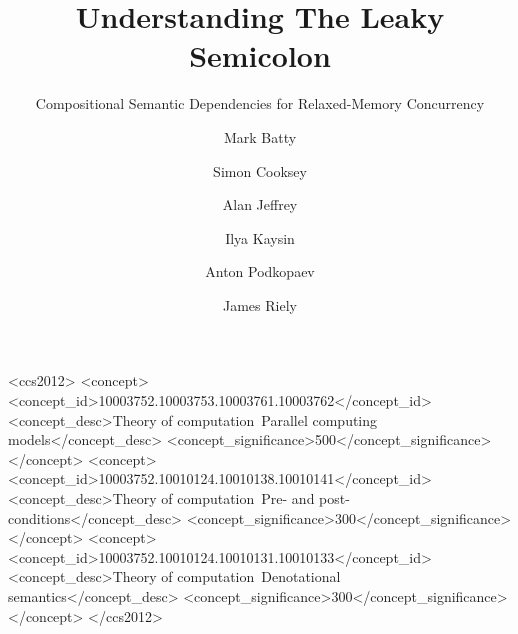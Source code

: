 \documentclass[acmsmall,screen,anonymous,review]{acmart}\settopmatter{printfolios=true}
\theoremstyle{acmdefinition}
\begin{document}
\title{Understanding The Leaky Semicolon}
\subtitle{Compositional Semantic Dependencies for Relaxed-Memory Concurrency}
\author{Mark Batty}

\author{Simon Cooksey}
\orcid{}

\author{Alan Jeffrey}

\author{Ilya Kaysin}
\orcid{}
\affiliation{
  \institution{}
  \city{}
  \country{}
}

\author{Anton Podkopaev}
\orcid{}
\affiliation{
  \institution{}
  \city{}
  \country{}
}

\author{James Riely}


\begin{abstract}

\end{abstract}

\begin{CCSXML}
<ccs2012>
   <concept>
       <concept_id>10003752.10003753.10003761.10003762</concept_id>
       <concept_desc>Theory of computation~Parallel computing models</concept_desc>
       <concept_significance>500</concept_significance>
       </concept>
   <concept>
       <concept_id>10003752.10010124.10010138.10010141</concept_id>
       <concept_desc>Theory of computation~Pre- and post-conditions</concept_desc>
       <concept_significance>300</concept_significance>
       </concept>
   <concept>
       <concept_id>10003752.10010124.10010131.10010133</concept_id>
       <concept_desc>Theory of computation~Denotational semantics</concept_desc>
       <concept_significance>300</concept_significance>
       </concept>
 </ccs2012>
\end{CCSXML}
\end{document}
